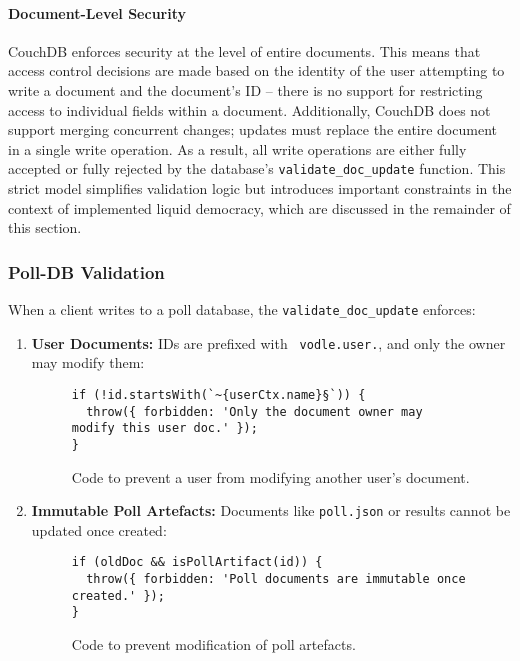 \paragraph{Document-Level Security}
CouchDB enforces security at the level of entire documents. This means that access control decisions are made based on the identity of the user attempting to write a document and the document's ID -- there is no support for restricting access to individual fields within a document. Additionally, CouchDB does not support merging concurrent changes; updates must replace the entire document in a single write operation. As a result, all write operations are either fully accepted or fully rejected by the database's \texttt{validate\_doc\_update} function. This strict model simplifies validation logic but introduces important constraints in the context of implemented liquid democracy, which are discussed in the remainder of this section.

\subsubsection{Poll-DB Validation}
When a client writes to a poll database, the \texttt{validate\_doc\_update} enforces:

\begin{enumerate}
  \item \textbf{User Documents:} IDs are prefixed with \texttt{~vodle.user.}, and only the owner may modify them:
\begin{figure}[H]
  \centering
\begin{verbatim}
if (!id.startsWith(`~{userCtx.name}§`)) {
  throw({ forbidden: 'Only the document owner may modify this user doc.' });
}
\end{verbatim}
\caption{Code to prevent a user from modifying another user's document.}
\end{figure}

  \item \textbf{Immutable Poll Artefacts: } Documents like \texttt{poll.json} or results cannot be updated once created:
\begin{figure}[H]
    \begin{verbatim}
if (oldDoc && isPollArtifact(id)) {
  throw({ forbidden: 'Poll documents are immutable once created.' });
}
    \end{verbatim}
\caption{Code to prevent modification of poll artefacts.}
\end{figure}
\end{enumerate}

